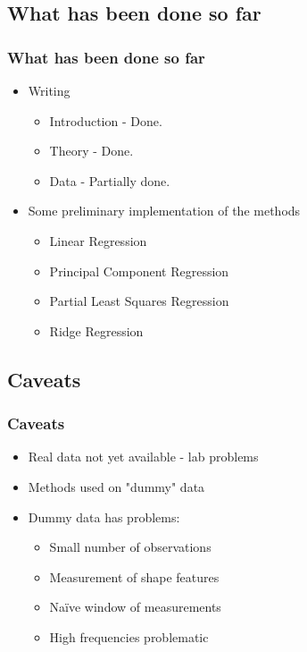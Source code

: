 \documentclass{beamer}
\begin{document}
\begin{frame}
	\section{What has been done so far}
	\frametitle{What has been done so far}
	
	\begin{itemize}
		\item Writing
		\begin{itemize}
			\item Introduction - Done.
			\item Theory - Done.
			\item Data - Partially done.
		\end{itemize}
		\item Some preliminary implementation of the methods
		\begin{itemize}
			\item Linear Regression
			\item Principal Component Regression
			\item Partial Least Squares Regression
			\item Ridge Regression
		\end{itemize}
	\end{itemize}
	
\end{frame}

\begin{frame}
	\section{Caveats}
	\frametitle{Caveats}
	
	\begin{itemize}
		\item Real data not yet available - lab problems
		\item Methods used on "dummy" data
		\item Dummy data has problems:
		\begin{itemize}
			\item Small number of observations
			\item Measurement of shape features
			\item Naïve window of measurements
			\item High frequencies problematic
		\end{itemize}
	\end{itemize}
	
\end{frame}
\end{document}
